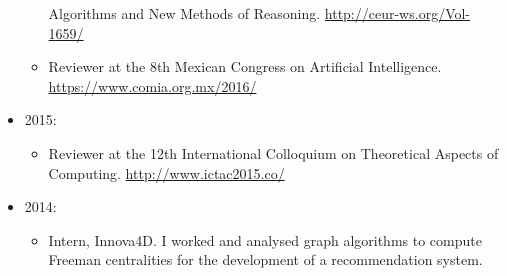 \begin{itemize}
\begin{itemize}
        Algorithms and New Methods of Reasoning. \url{http://ceur-ws.org/Vol-1659/}
      \item Reviewer at the 8th Mexican Congress on Artificial Intelligence.
        \url{https://www.comia.org.mx/2016/}
    \end{itemize}
  \item 2015:
    \begin{itemize}
      \item Reviewer at the 12th International Colloquium on Theoretical
        Aspects of Computing. \url{http://www.ictac2015.co/}
    \end{itemize}
  \item 2014:
    \begin{itemize}
      \item Intern, Innova4D. I worked and analysed graph algorithms to
        compute Freeman centralities for the development of a recommendation
        system.
    \end{itemize}
\end{itemize}

